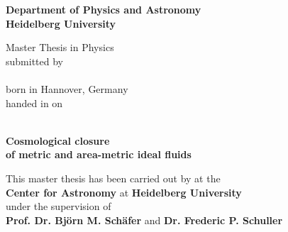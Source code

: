 \begin{titlepage}
\begin{center}
\makeatletter

\Large\textbf{Department of Physics and Astronomy\\
Heidelberg University}

\vfill

\normalsize
Master Thesis in Physics\\
\normalsize
submitted by\\[0.5cm]
\Large
\textbf{\@author}\\
\normalsize
born in Hannover, Germany\\[0.5cm]
\normalsize
handed in on\\
\Large
\textbf{\@date}\\[0.5cm]
\normalsize


\cleardoublepage
\thispagestyle{empty}


\LARGE\textbf{Cosmological closure \\ of metric and area-metric ideal fluids}

\vfill

\normalsize
This master thesis has been carried out by \@author{} at the\\
\textbf{Center for Astronomy} at \textbf{Heidelberg University}\\
under the supervision of\\
\textbf{Prof. Dr. Björn M. Schäfer} and \textbf{Dr. Frederic P. Schuller}

\makeatother
\end{center}
\end{titlepage}
